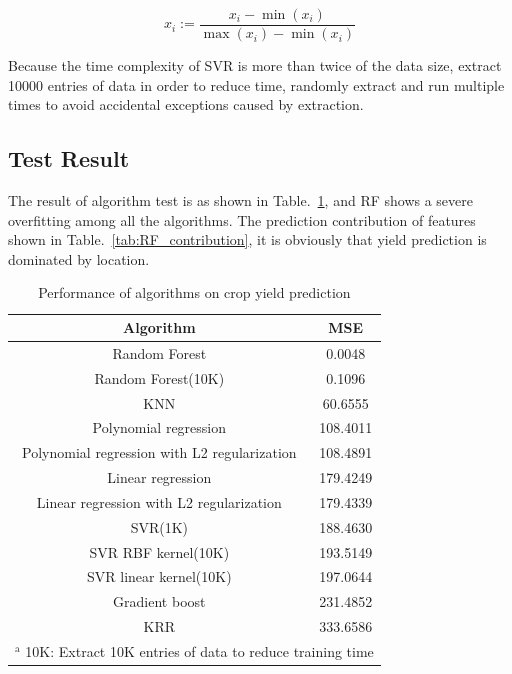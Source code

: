 \documentclass[conference]{IEEEtran}
\begin{document}
\begin{equation}
  x_i := \frac{x_i-\min \left( x_i \right)}{\max \left( x_i \right) -\min \left( x_i \right)}
\label{eq:standarlize}
\end{equation}

Because the time complexity of SVR is more than twice of the data size\cite{clarke2005analysis}, extract 10000 entries of data in order to reduce time, randomly extract and run multiple times to avoid accidental exceptions caused by extraction.



\subsection{Test Result}
The result of algorithm test is as shown in Table.~\ref{tab:result}, and RF shows a severe overfitting among all the algorithms. The prediction contribution of features shown in Table.~\ref{tab:RF_contribution}, it is obviously that yield prediction is dominated by location.

\begin{table}[htbp]
  \caption{Performance of algorithms on crop yield prediction}
  \begin{center}
  \begin{tabular}{|c|c|}
  \hline
  Algorithm                                    & MSE      \\
  \hline
  Random Forest \cite{liaw2002classification}                               & 0.0048   \\
  Random Forest(10K)                           & 0.1096   \\
  KNN \cite{peterson2009k}                                         & 60.6555  \\
  Polynomial regression  \cite{theil1992rank}                      & 108.4011 \\
  Polynomial regression with L2 regularization & 108.4891 \\
  Linear regression \cite{vapnik2013nature}                           & 179.4249 \\
  Linear regression with L2 regularization     & 179.4339 \\
  SVR(1K) \cite{drucker1997support}                                     & 188.4630 \\
  SVR RBF kernel(10K) \cite{cristianini2000introduction}                         & 193.5149 \\
  SVR linear kernel(10K) \cite{cristianini2000introduction}                      & 197.0644 \\
  Gradient boost \cite{ke2017lightgbm}                              & 231.4852 \\
  KRR  \cite{saunders1998ridge}                                        & 333.6586 \\
  \hline
  \multicolumn{2}{l}{$^{\mathrm{a}}$ 10K: Extract 10K entries of data to reduce training time} \\
  \end{tabular}
  \label{tab:result}
  \end{center}
\end{table}
\end{document}
